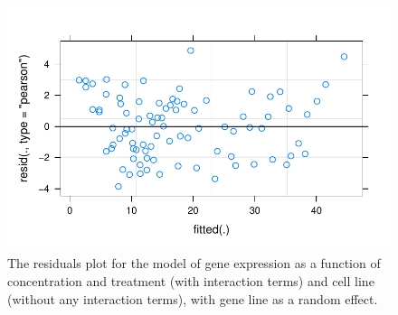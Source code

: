 \documentclass[
  letterpaper,
  DIV=11,
  numbers=noendperiod]{scrartcl}
\begin{document}
\begin{figure}

{\centering \includegraphics{2023-05-16_IMRaD-report_AStephenson_files/figure-pdf/fig-m3-plot-1.pdf}

}

\caption{\label{fig-m3-plot}The residuals plot for the model of gene
expression as a function of concentration and treatment (with
interaction terms) and cell line (without any interaction terms), with
gene line as a random effect.}

\end{figure}
\end{document}

